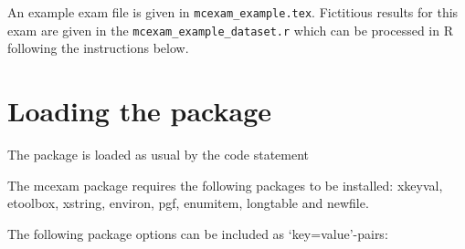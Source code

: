 \documentclass{article}
\begin{document}
An example exam file is given in \verb$mcexam_example.tex$. Fictitious results for this exam are given in the \verb$mcexam_example_dataset.r$ which can be processed in R following the instructions below.

































\section{Loading the package}

The package is loaded as usual by the code statement 
\begin{code}[commandchars=\!\?\;]
\usepackage[!emph?<options>;]{mcexam}
\end{code}
The \textsf{mcexam} package requires the following packages to be installed: 
\textsf{xkeyval}, 
\textsf{etoolbox}, 
\textsf{xstring}, 
\textsf{environ}, 
\textsf{pgf}, 
\textsf{enumitem}, 
\textsf{longtable} and 
\textsf{newfile}.

The following package options can be included as `key=value'-pairs:
\end{document}
